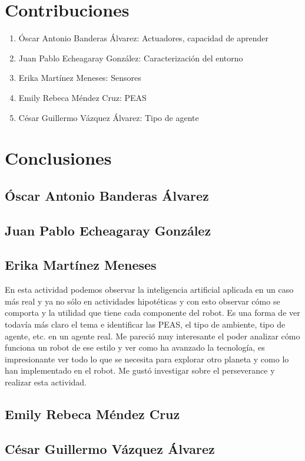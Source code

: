 \documentclass{article}
\begin{document}
    \section{Contribuciones}
        \begin{enumerate}
            \item Óscar Antonio Banderas Álvarez: Actuadores, capacidad de aprender
            \item Juan Pablo Echeagaray González: Caracterización del entorno
            \item Erika Martínez Meneses: Sensores
            \item Emily Rebeca Méndez Cruz: PEAS
            \item César Guillermo Vázquez Álvarez: Tipo de agente
        \end{enumerate}

    \section{Conclusiones}
        \subsection{Óscar Antonio Banderas Álvarez}

        \subsection{Juan Pablo Echeagaray González}
        
        \subsection{Erika Martínez Meneses}
            En esta actividad podemos observar la inteligencia artificial aplicada en un caso más real y ya no sólo en actividades hipotéticas y con esto observar cómo se comporta y la utilidad que tiene cada componente del robot. Es una forma de ver todavía más claro el tema e identificar las PEAS, el tipo de ambiente, tipo de agente, etc. en un agente real. Me pareció muy interesante el poder analizar cómo funciona un robot de ese estilo y ver como ha avanzado la tecnología, es impresionante ver todo lo que se necesita para explorar otro planeta y como lo han implementado en el robot. Me gustó investigar sobre el perseverance y realizar esta actividad.
            
        \subsection{Emily Rebeca Méndez Cruz}

        \subsection{César Guillermo Vázquez Álvarez}
        
    \clearpage
    \nocite{*}
    \printbibliography
\end{document}

